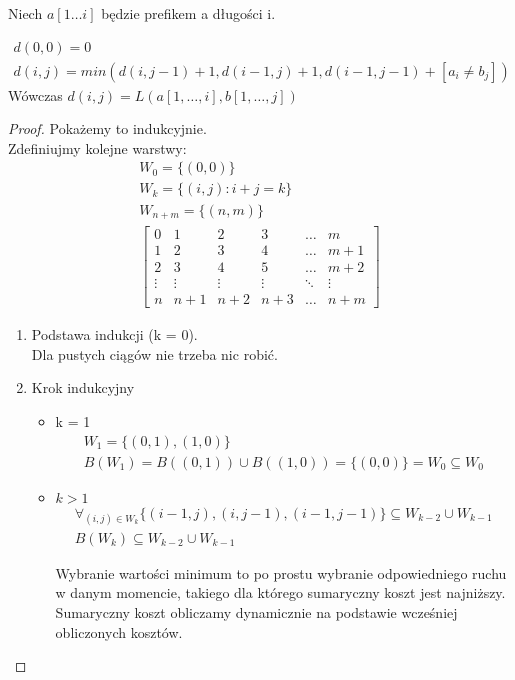 \documentclass[paper=a4, fontsize=11pt]{article}
\begin{document}
\begin{mydef}[Prefiks]
Niech $a[1 \dots i]$ będzie prefikem a długości i.
\end{mydef}
\begin{theorem} 
\begin{gather*}
d(0,0) = 0 \\
d(i, j) = min(d(i, j-1) + 1 , d(i-1, j) + 1, d(i-1, j-1) + [a_i \neq b_j])
\end{gather*}
Wówczas $d(i, j) = L(a[1, \dots, i], b[1, \dots, j])$
\end{theorem}
\begin{proof} Pokażemy to indukcyjnie. \\
Zdefiniujmy kolejne warstwy:
\begin{gather*}
W_0 = \{(0, 0)\} \\
W_k = \{(i, j) : i + j = k \} \\
W_{n+m} = \{(n, m)\} \\
\begin{bmatrix}
0 & 1 & 2 & 3 & \dots & m \\
1 & 2 & 3 & 4 & \dots & m + 1 \\
2 & 3 & 4 & 5 & \dots & m + 2\\
\vdots & \vdots & \vdots & \vdots & \ddots & \vdots \\
n & n+1 & n+2 & n+3 & \dots & n+m
\end{bmatrix}
\end{gather*}
\begin{enumerate}
\item Podstawa indukcji (k = 0). \\
Dla pustych ciągów nie trzeba nic robić.
\item Krok indukcyjny
\begin{itemize}
\item k = 1 \\
\begin{gather}
W_1 = \{(0, 1), (1, 0)\} \\
B({W_1}) = B((0,1)) \cup B((1,0)) = \{(0,0) \} = W_0 \subseteq W_0
\end{gather}
\item $k > 1$ \\
\begin{gather*}
\forall_{(i, j) \in W_k} \{(i-1, j), (i, j-1), (i-1, j-1)\} \subseteq W_{k-2} \cup W_{k-1} \\
B(W_k) \subseteq W_{k-2}  \cup W_{k-1}
\end{gather*}

Wybranie wartości minimum to po prostu wybranie odpowiedniego ruchu w danym momencie, takiego dla którego sumaryczny koszt jest najniższy. Sumaryczny koszt obliczamy dynamicznie na podstawie wcześniej obliczonych kosztów.
\end{itemize}

\end{enumerate}

\end{proof}
\end{document}
